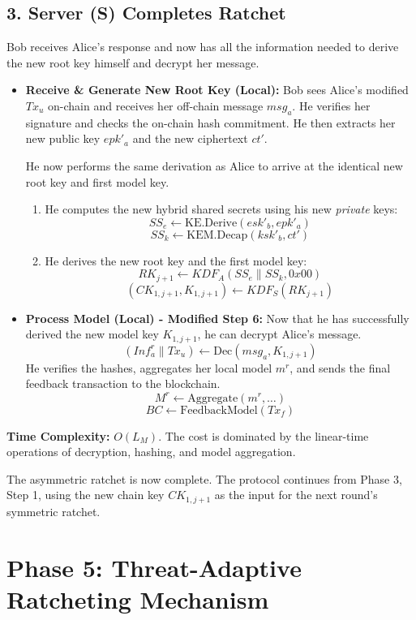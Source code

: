 \documentclass[12pt]{article}
\begin{document}
\subsection*{3. Server (S) Completes Ratchet}
Bob receives Alice's response and now has all the information needed to derive the new root key himself and decrypt her message.

\begin{itemize}
    \item \textbf{Receive \& Generate New Root Key (Local):} Bob sees Alice's modified \( Tx_u \) on-chain and receives her off-chain message \( msg_a \). He verifies her signature and checks the on-chain hash commitment. He then extracts her new public key \( epk'_a \) and the new ciphertext \( ct' \).
    
    He now performs the same derivation as Alice to arrive at the identical new root key and first model key.
    \begin{enumerate}
        \item He computes the new hybrid shared secrets using his new \textit{private} keys:
        \[ SS_e \leftarrow \text{KE.Derive}(esk'_b, epk'_a) \]
        \[ SS_k \leftarrow \text{KEM.Decap}(ksk'_b, ct') \]
        \item He derives the new root key and the first model key:
        \[ RK_{j+1} \leftarrow KDF_A(SS_e \parallel SS_k, 0x00) \]
        \[ (CK_{1,j+1}, K_{1,j+1}) \leftarrow KDF_S(RK_{j+1}) \]
    \end{enumerate}
    
    \item \textbf{Process Model (Local) - Modified Step 6:} Now that he has successfully derived the new model key \( K_{1,j+1} \), he can decrypt Alice's message.
    \[ (Inf_a^r \parallel Tx_u) \leftarrow \text{Dec}(msg_a, K_{1,j+1}) \]
    He verifies the hashes, aggregates her local model \( m^r \), and sends the final feedback transaction to the blockchain.
    \[ M^r \leftarrow \text{Aggregate}(m^r, \dots) \]
    \[ BC \leftarrow \text{FeedbackModel}(Tx_f) \]
\end{itemize}
\textbf{Time Complexity:} \( O(L_M) \). The cost is dominated by the linear-time operations of decryption, hashing, and model aggregation.

The asymmetric ratchet is now complete. The protocol continues from Phase 3, Step 1, using the new chain key \( CK_{1,j+1} \) as the input for the next round's symmetric ratchet.
\newpage

\section*{Phase 5: Threat-Adaptive Ratcheting Mechanism}
\end{document}
